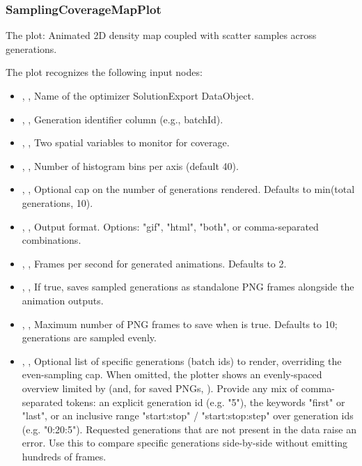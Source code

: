 \subsubsection{SamplingCoverageMapPlot}
The   plot: Animated 2D density map coupled with scatter samples across generations.

The  plot recognizes the following input nodes:
\begin{itemize}
  \item {}, , Name of the optimizer SolutionExport DataObject.
  \item {}, , Generation identifier column (e.g., batchId).
  \item {}, , Two spatial variables to monitor for coverage.
  \item {}, , Number of histogram bins per axis (default 40).
  \item {}, , Optional cap on the number of generations rendered. Defaults to min(total generations, 10).
  \item {}, , Output format. Options: "gif", "html", "both", or comma-separated combinations.
  \item {}, , Frames per second for generated animations. Defaults to 2.
  \item {}, , If true, saves sampled generations as standalone PNG frames alongside the animation outputs.
  \item {}, , Maximum number of PNG frames to save when  is true. Defaults to 10; generations are sampled evenly.
  \item {}, , Optional list of specific generations (batch ids) to render, overriding the even-sampling cap. When omitted, the plotter shows an evenly-spaced overview limited by  (and, for saved PNGs, ). Provide any mix of comma-separated tokens: an explicit generation id (e.g. "5"), the keywords "first" or "last", or an inclusive range "start:stop" / "start:stop:step" over generation ids (e.g. "0:20:5"). Requested generations that are not present in the data raise an error. Use this to compare specific generations side-by-side without emitting hundreds of frames.
\end{itemize}

